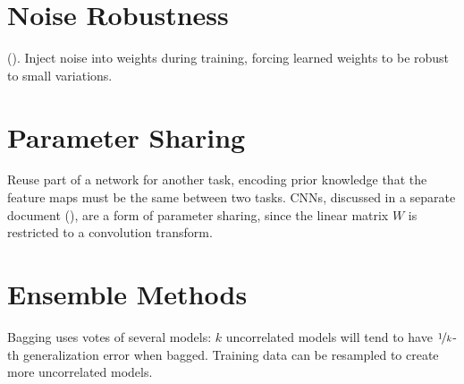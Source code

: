 \documentclass{article}
\begin{document}
\section{Noise Robustness}

(). Inject noise into weights during training, forcing learned weights to be robust to small variations.

\section{Parameter Sharing}

Reuse part of a network for another task, encoding prior knowledge that the feature maps must be the same between two tasks. CNNs, discussed in a separate document (), are a form of parameter sharing, since the linear matrix $W$ is restricted to a convolution transform.

\section{Ensemble Methods}

Bagging uses votes of several models: $k$ uncorrelated models will tend to have $\nicefrac{1}{k}$-th generalization error when bagged. Training data can be resampled to create more uncorrelated models.
\end{document}
